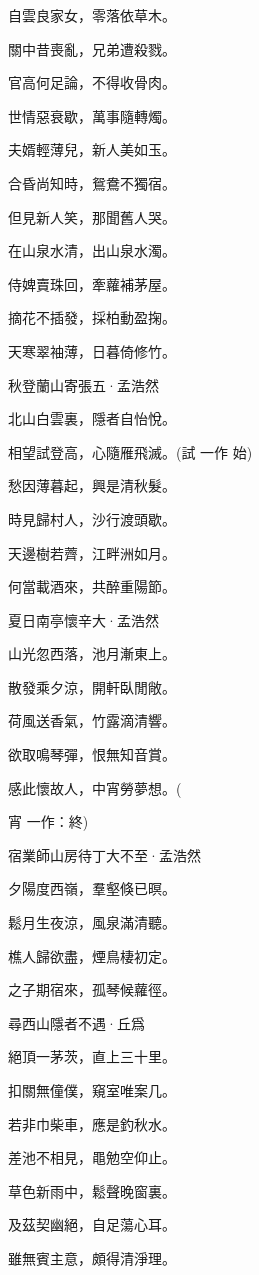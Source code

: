 \documentclass[12pt,a4paper]{ctexbook}
\begin{document}
自雲良家女，零落依草木。\par
關中昔喪亂，兄弟遭殺戮。\par
官高何足論，不得收骨肉。\par
世情惡衰歇，萬事隨轉燭。\par
夫婿輕薄兒，新人美如玉。\par
合昏尚知時，鴛鴦不獨宿。\par
但見新人笑，那聞舊人哭。\par
在山泉水清，出山泉水濁。\par
侍婢賣珠回，牽蘿補茅屋。\par
摘花不插發，採柏動盈掬。\par
天寒翠袖薄，日暮倚修竹。\par
秋登蘭山寄張五·孟浩然\par
北山白雲裏，隱者自怡悅。\par
相望試登高，心隨雁飛滅。(試 一作 始)\par
愁因薄暮起，興是清秋髮。\par
時見歸村人，沙行渡頭歇。\par
天邊樹若薺，江畔洲如月。\par
何當載酒來，共醉重陽節。\par
夏日南亭懷辛大·孟浩然\par
山光忽西落，池月漸東上。\par
散發乘夕涼，開軒臥閒敞。\par
荷風送香氣，竹露滴清響。\par
欲取鳴琴彈，恨無知音賞。\par
感此懷故人，中宵勞夢想。(\par
宵 一作：終)\par
宿業師山房待丁大不至·孟浩然\par
夕陽度西嶺，羣壑倏已暝。\par
鬆月生夜涼，風泉滿清聽。\par
樵人歸欲盡，煙鳥棲初定。\par
之子期宿來，孤琴候蘿徑。\par
尋西山隱者不遇·丘爲\par
絕頂一茅茨，直上三十里。\par
扣關無僮僕，窺室唯案几。\par
若非巾柴車，應是釣秋水。\par
差池不相見，黽勉空仰止。\par
草色新雨中，鬆聲晚窗裏。\par
及茲契幽絕，自足蕩心耳。\par
雖無賓主意，頗得清淨理。\par
\end{document}

